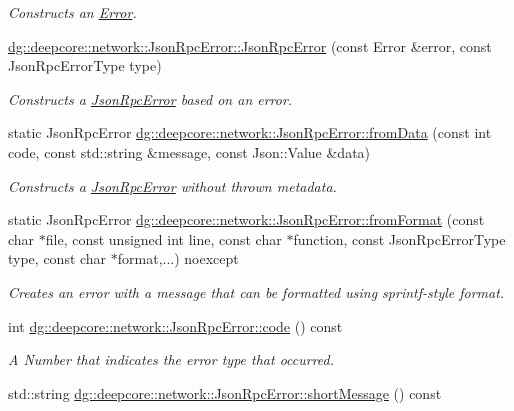\begin{DoxyCompactItemize}
\begin{DoxyCompactList}\small\item\em Constructs an \hyperlink{classdg_1_1deepcore_1_1_error}{Error}. \end{DoxyCompactList}\item 
\hyperlink{group___network_module_ga15642140f0fe7b5bc798cdd884954040}{dg\+::deepcore\+::network\+::\+Json\+Rpc\+Error\+::\+Json\+Rpc\+Error} (const Error \&error, const Json\+Rpc\+Error\+Type type)
\begin{DoxyCompactList}\small\item\em Constructs a \hyperlink{classdg_1_1deepcore_1_1network_1_1_json_rpc_error}{Json\+Rpc\+Error} based on an error. \end{DoxyCompactList}\item 
static Json\+Rpc\+Error \hyperlink{group___network_module_gaef99638ab60920c9af55d3c15349119f}{dg\+::deepcore\+::network\+::\+Json\+Rpc\+Error\+::from\+Data} (const int code, const std\+::string \&message, const Json\+::\+Value \&data)
\begin{DoxyCompactList}\small\item\em Constructs a \hyperlink{classdg_1_1deepcore_1_1network_1_1_json_rpc_error}{Json\+Rpc\+Error} without thrown metadata. \end{DoxyCompactList}\item 
static Json\+Rpc\+Error \hyperlink{group___network_module_ga2fdfe2154c20e91cb5f0205ced658714}{dg\+::deepcore\+::network\+::\+Json\+Rpc\+Error\+::from\+Format} (const char $\ast$file, const unsigned int line, const char $\ast$function, const Json\+Rpc\+Error\+Type type, const char $\ast$format,...) noexcept
\begin{DoxyCompactList}\small\item\em Creates an error with a message that can be formatted using sprintf-\/style format. \end{DoxyCompactList}\item 
int \hyperlink{group___network_module_gab5f760ae09f901ed94e08ea1c0d26e50}{dg\+::deepcore\+::network\+::\+Json\+Rpc\+Error\+::code} () const 
\begin{DoxyCompactList}\small\item\em A Number that indicates the error type that occurred. \end{DoxyCompactList}\item 
std\+::string \hyperlink{group___network_module_gab4cfbb46ab5f2ce706d08b5daf106263}{dg\+::deepcore\+::network\+::\+Json\+Rpc\+Error\+::short\+Message} () const 

\end{DoxyCompactItemize}
